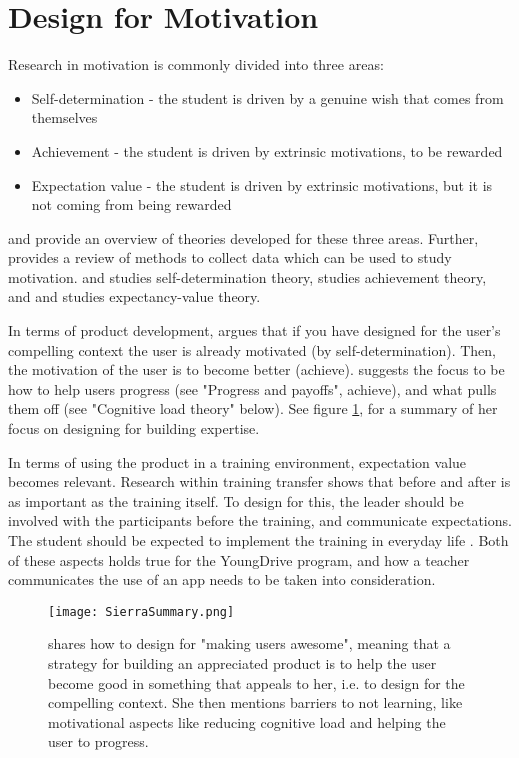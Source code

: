 \section{Design for Motivation}\label{sec:motivation}

Research in motivation is commonly divided into three areas:

\begin{itemize}
\item Self-determination - the student is driven by a genuine wish that comes from themselves
\item Achievement - the student is driven by extrinsic motivations, to be rewarded
\item Expectation value - the student is driven by extrinsic motivations, but it is not coming from being rewarded
\end{itemize}

\cite{koballa} and \cite{abell} provide an overview of theories developed for these three areas. Further, \cite{fulmer} provides a review of methods to collect data which can be used to study motivation. \cite{deci} and \cite{ryan} studies self-determination theory, \cite{elliot} studies achievement theory, and \cite{eccles} and \cite{wigfield} studies expectancy-value theory.

In terms of product development, \cite{sierra} argues that if you have designed for the user's compelling context the user is already motivated (by self-determination). Then, the motivation of the user is to become better (achieve). \cite{sierra} suggests the focus to be how to help users progress (see "Progress and payoffs", achieve), and what pulls them off (see "Cognitive load theory" below). See figure \ref{fig:sierra-summary}, for a summary of her focus on designing for building expertise.

In terms of using the product in a training environment, expectation value becomes relevant. Research within training transfer \citep{brinkerhoff} shows that before and after is as important as the training itself. To design for this, the leader should be involved with the participants before the training, and communicate expectations. The student should be expected to implement the training in everyday life \citep{brinkerhoff}. Both of these aspects holds true for the YoungDrive program, and how a teacher communicates the use of an app needs to be taken into consideration.

\begin{figure}[h]
  \centering
  \texttt{[image: SierraSummary.png]}
  \caption{\cite{sierra} shares how to design for "making users awesome", meaning that a strategy for building an appreciated product is to help the user become good in something that appeals to her, i.e. to design for the compelling context. She then mentions barriers to not learning, like motivational aspects like reducing cognitive load and helping the user to progress.}
  \label{fig:sierra-summary}
\end{figure}

